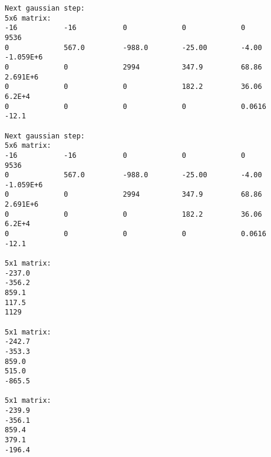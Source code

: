 \documentclass[letterpaper,12pt]{article}
\begin{document}
\begin{verbatim}
Next gaussian step:
5x6 matrix:
-16           -16           0             0             0             9536          
0             567.0         -988.0        -25.00        -4.00         -1.059E+6     
0             0             2994          347.9         68.86         2.691E+6      
0             0             0             182.2         36.06         6.2E+4        
0             0             0             0             0.0616        -12.1         

Next gaussian step:
5x6 matrix:
-16           -16           0             0             0             9536          
0             567.0         -988.0        -25.00        -4.00         -1.059E+6     
0             0             2994          347.9         68.86         2.691E+6      
0             0             0             182.2         36.06         6.2E+4        
0             0             0             0             0.0616        -12.1         

5x1 matrix:
-237.0        
-356.2        
859.1         
117.5         
1129          

5x1 matrix:
-242.7        
-353.3        
859.0         
515.0         
-865.5        

5x1 matrix:
-239.9        
-356.1        
859.4         
379.1         
-196.4
\end{verbatim}
\end{document}
